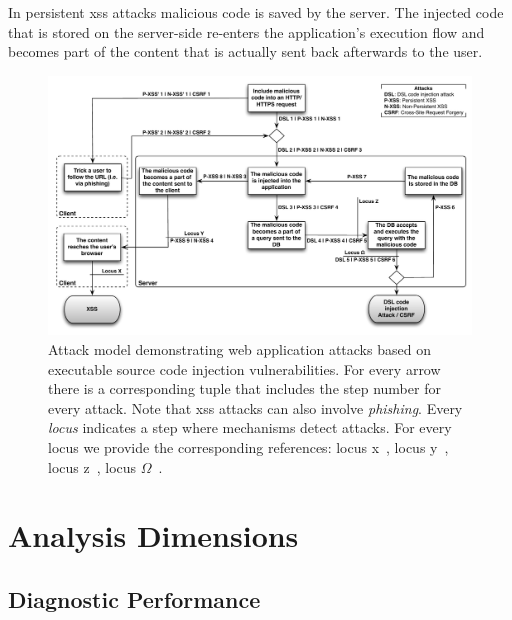 \documentclass[conference]{IEEEtran}
\begin{document}
In persistent {\sc xss} attacks malicious code is saved by the server.
The injected code that is stored on the server-side re-enters the
application's execution flow and becomes part of the content that is
actually sent back afterwards to the user.

\begin{figure}
\begin{center}
\leavevmode
\includegraphics[scale=0.61]{attacks-steps.pdf}
\end{center}
\caption{\label{fig:attacks}Attack model demonstrating web
application attacks based on executable source
code injection vulnerabilities. For every arrow there is a
corresponding tuple that includes the step number for
every attack. Note that {\sc xss} attacks can also involve
{\it phishing}. Every {\it locus} indicates a step where mechanisms
detect attacks. For every locus we provide the corresponding
references:
locus {\sc x}~\cite{KJKV09,TNH07,NSS06,APKLM10,SPPGMMB04,ML10,YCIS07,PSC09,VDDPJ11,OWVS08,DDHPJ10,GC09,VFJKKV07,SLMS14,BV08},
locus {\sc y}~\cite{RDWDE07,JKK06a,JB07,NLC07,WPLKK09,JEP08},
locus {\sc z}~\cite{BWS05,SW06,PS11,HCF05,XBS06,PB05,PMP11,MS09,HO05,SMS13},
locus $\Omega$~\cite{BK04,LLW02,VMV05}.}
\end{figure}

\section{Analysis Dimensions}
\label{sec:dimensions}

\subsection{Diagnostic Performance}
\end{document}
